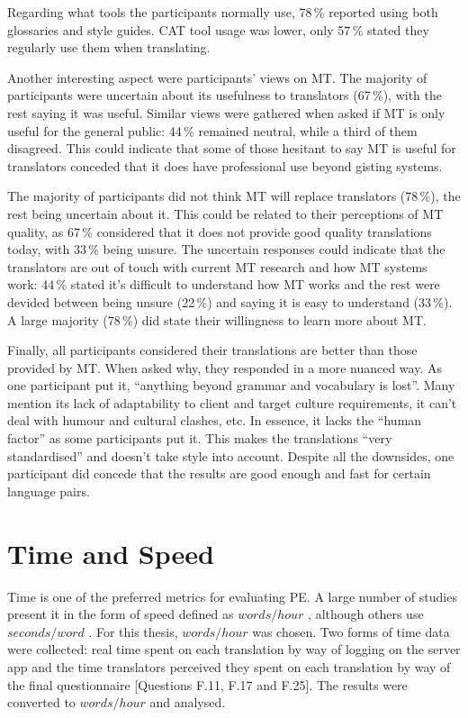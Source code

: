 \noindent Regarding what tools the participants normally use, 78\,\% reported using both glossaries and style guides. \ac{CAT} tool usage was lower, only 57\,\% stated they regularly use them when translating.

Another interesting aspect were participants' views on \ac{MT}. The majority of participants were uncertain about its usefulness to translators (67\,\%), with the rest saying it was useful. Similar views were gathered when asked if \ac{MT} is only useful for the general public: 44\,\% remained neutral, while a third of them disagreed. This could indicate that some of those hesitant to say \ac{MT} is useful for translators conceded that it does have professional use beyond gisting systems.

The majority of participants did not think \ac{MT} will replace translators (78\,\%), the rest being uncertain about it. This could be related to their perceptions of \ac{MT} quality, as 67\,\% considered that it does not provide good quality translations today, with 33\,\% being unsure. The uncertain responses could indicate that the translators are out of touch with current \ac{MT} research and how \ac{MT} systems work: 44\,\% stated it's difficult to understand how \ac{MT} works and the rest were devided between being unsure (22\,\%) and saying it is easy to understand (33\,\%). A large majority (78\,\%) did state their willingness to learn more about \ac{MT}.

Finally, all participants considered their translations are better than those provided by \ac{MT}. When asked why, they responded in a more nuanced way. As one participant put it, ``anything beyond grammar and vocabulary is lost''. Many mention its lack of adaptability to client and target culture requirements, it can't deal with humour and cultural clashes, etc. In essence, it lacks the ``human factor'' as some participants put it. This makes the translations ``very standardised'' and doesn't take style into account. Despite all the downsides, one participant did concede that the results are good enough and fast for certain language pairs.



\section{Time and Speed}

\noindent Time is one of the preferred metrics for evaluating \ac{PE}. A large number of studies present it in the form of speed defined as $words/hour$ \parencite{federico2012measuring}, although others use $seconds/word$ \parencite{koponen2012post}. For this thesis, $words/hour$ was chosen. Two forms of time data were collected: real time spent on each translation by way of logging on the server app and the time translators perceived they spent on each translation by way of the final questionnaire [Questions F.11, F.17 and F.25]. The results were converted to $words/hour$ and analysed.


